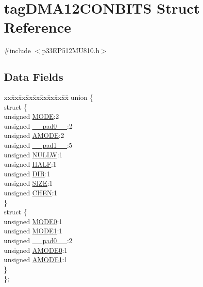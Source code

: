 \hypertarget{structtag_d_m_a12_c_o_n_b_i_t_s}{}\section{tag\+D\+M\+A12\+C\+O\+N\+B\+I\+TS Struct Reference}
\label{structtag_d_m_a12_c_o_n_b_i_t_s}


{\ttfamily \#include $<$p33\+E\+P512\+M\+U810.\+h$>$}

\subsection*{Data Fields}
\begin{DoxyCompactItemize}
\item 
\begin{tabbing}
xx\=xx\=xx\=xx\=xx\=xx\=xx\=xx\=xx\=\kill
union \{\\
\>struct \{\\
\>\>unsigned \hyperlink{structtag_d_m_a12_c_o_n_b_i_t_s_adc56ba18ff3f1599c85d222bee624424}{MODE}:2\\
\>\>unsigned \hyperlink{structtag_d_m_a12_c_o_n_b_i_t_s_adf71f3d8410c1f1dbbc96680a92c49af}{\_\_pad0\_\_}:2\\
\>\>unsigned \hyperlink{structtag_d_m_a12_c_o_n_b_i_t_s_ab3ff4e1f1b9a1037418ca7b6cb2e8f77}{AMODE}:2\\
\>\>unsigned \hyperlink{structtag_d_m_a12_c_o_n_b_i_t_s_acaf2d0924a107ec6e8d2e31febaf66f9}{\_\_pad1\_\_}:5\\
\>\>unsigned \hyperlink{structtag_d_m_a12_c_o_n_b_i_t_s_a1d3f7d04416314131889d1671a9287ad}{NULLW}:1\\
\>\>unsigned \hyperlink{structtag_d_m_a12_c_o_n_b_i_t_s_a1a715a64b2576f59401ac93d6f9a086a}{HALF}:1\\
\>\>unsigned \hyperlink{structtag_d_m_a12_c_o_n_b_i_t_s_ad6868749602045a76f36ffdf964dfd39}{DIR}:1\\
\>\>unsigned \hyperlink{structtag_d_m_a12_c_o_n_b_i_t_s_a5863cac6dc2cb330bdd0b1c66da70ffe}{SIZE}:1\\
\>\>unsigned \hyperlink{structtag_d_m_a12_c_o_n_b_i_t_s_a092934036fdfb8df5259db288fe438ca}{CHEN}:1\\
\>\} \\
\>struct \{\\
\>\>unsigned \hyperlink{structtag_d_m_a12_c_o_n_b_i_t_s_abc938903e74bff48935569d0c5b19035}{MODE0}:1\\
\>\>unsigned \hyperlink{structtag_d_m_a12_c_o_n_b_i_t_s_a7a9f7514566d0626724ce6c4b81b5ea2}{MODE1}:1\\
\>\>unsigned \hyperlink{structtag_d_m_a12_c_o_n_b_i_t_s_adf71f3d8410c1f1dbbc96680a92c49af}{\_\_pad0\_\_}:2\\
\>\>unsigned \hyperlink{structtag_d_m_a12_c_o_n_b_i_t_s_a0a1f894a2695c1388a5412244636805b}{AMODE0}:1\\
\>\>unsigned \hyperlink{structtag_d_m_a12_c_o_n_b_i_t_s_a3fde4abc0dc3db6fef6afc28c565ce3e}{AMODE1}:1\\
\>\} \\
\}; \\


\end{tabbing}
\end{DoxyCompactItemize}
